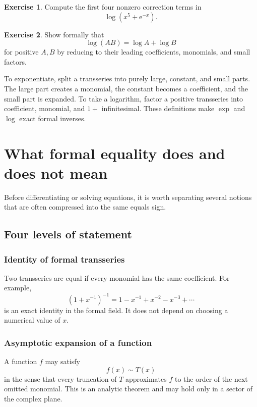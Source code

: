 \documentclass[11pt,openany]{book}
\theoremstyle{definition}
\newtheorem{exercise}{Exercise}[chapter]
\theoremstyle{plain}
\theoremstyle{remark}
\newcommand{\e}{\mathrm{e}}
\newcommand{\asym}{\sim}
\begin{document}
\begin{exercise}
Compute the first four nonzero correction terms in
\[
 \log(x^5+\e^{-x}).
\]
\end{exercise}

\begin{exercise}
Show formally that
\[
 \log(AB)=\log A+\log B
\]
for positive $A,B$ by reducing to their leading coefficients, monomials, and small factors.
\end{exercise}

\begin{summarybox}
To exponentiate, split a transseries into purely large, constant, and small parts. The large part creates a monomial, the constant becomes a coefficient, and the small part is expanded. To take a logarithm, factor a positive transseries into coefficient, monomial, and $1+$ infinitesimal. These definitions make $\exp$ and $\log$ exact formal inverses.
\end{summarybox}


\chapter{What formal equality does and does not mean}\label{ch:formal-meaning}

Before differentiating or solving equations, it is worth separating several notions that are often compressed into the same equals sign.

\section{Four levels of statement}

\subsection{Identity of formal transseries}

Two transseries are equal if every monomial has the same coefficient. For example,
\[
 (1+x^{-1})^{-1}=1-x^{-1}+x^{-2}-x^{-3}+\cdots
\]
is an exact identity in the formal field. It does not depend on choosing a numerical value of $x$.

\subsection{Asymptotic expansion of a function}

A function $f$ may satisfy
\[
 f(x)\asym T(x)
\]
in the sense that every truncation of $T$ approximates $f$ to the order of the next omitted monomial. This is an analytic theorem and may hold only in a sector of the complex plane.
\end{document}
